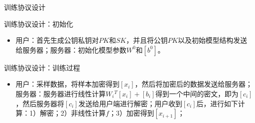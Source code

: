 \documentclass{beamer}
\begin{document}
\begin{frame}{训练协议设计}
    \begin{minipage}[l]{0.7\linewidth}
    \begin{exampleblock}{训练协议设计：初始化}
        	\begin{itemize}
    		\item {\footnotesize 用户：首先生成公钥私钥对$PK$和$SK$，并且将公钥$PK$以及初始模型结构发送给服务器；服务器：初始化模型参数$W^0$和$[b^0]$。}
    	\end{itemize}
    \end{exampleblock}
    \begin{exampleblock}{训练协议设计：训练过程}
        	\begin{itemize}
    		\item {\footnotesize 用户：采样数据，将样本加密得到$[x_i]$，然后将加密后的数据发送给服务器；服务器：服务器进行线性计算$W{_i}{^T}[x_i]+[b_i]$得到一个中间的密文，即为$[c_i]$，然后服务器将$[c_i]$发送给用户端进行解密；用户收到$[c_i]$后，进行如下计算：1）解密；2）非线性计算$f$；3）加密得到$[x_{i+1}]$；}
    	\end{itemize}
    \end{exampleblock}
   \end{minipage}
    \begin{minipage}{0.2\linewidth}
        \begin{figure}[h]
            \centering
             \hspace{2cm}

\end{figure}
\end{minipage}
\end{frame}
\end{document}
